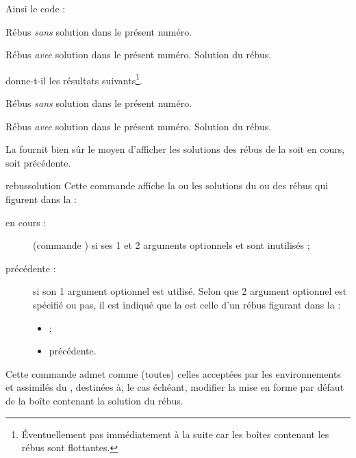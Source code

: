 \documentclass{letgut}
\begin{document}
Ainsi le code :

\begin{ltx-code}[title addon=rébus]
\begin{rebus}[no solution]
  Rébus \emph{sans} solution dans le présent numéro.
\end{rebus}
\begin{rebus}
  Rébus \emph{avec} solution dans le présent numéro.
  \solution
  Solution du rébus.
\end{rebus}
\end{ltx-code}

donne-t-il les résultats suivants\footnote{Éventuellement pas immédiatement à la
  suite car les boîtes contenant les rébus sont flottantes.}.

\begin{rebus}
  Rébus \emph{sans} solution dans le présent numéro.
\end{rebus}
\begin{rebus}[nofloat]
  Rébus \emph{avec} solution dans le présent numéro.
  \solution
  Solution du rébus.
\end{rebus}

La  fournit bien sûr le moyen d'afficher les solutions des rébus de
la 
soit en cours, soit précédente.

\begin{docCommand}{rebussolution}{}
  Cette commande affiche la ou les solutions du ou des rébus qui figurent dans
  la  :
  \begin{description}
  \item[en cours :] (commande ) si ses 1\ier{} et
    2\ieme{} arguments optionnels  et  sont
    inutilisés ;
  \item[précédente :] si son 1\ier{} argument optionnel  est
    utilisé. Selon que 2\ieme{} argument optionnel  est spécifié ou
    pas, il est indiqué que la  est celle d'un rébus figurant
    dans la  :
    \begin{itemize}
    \item {} ;
    \item précédente.
    \end{itemize}
  \end{description}
  Cette commande admet comme  (toutes) celles acceptées par les
  environnements  et assimilés du ,
  destinées à, le cas échéant, modifier la mise en forme par défaut de la boîte
  contenant la solution du rébus.
\end{docCommand}
\end{document}
